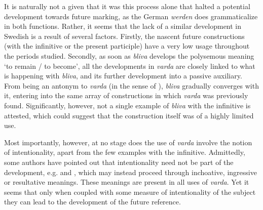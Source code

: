 \documentclass[output=paper,colorlinks,citecolor=brown]{langscibook}
\begin{document}
It is naturally not a given that it was this process alone that halted a potential development towards future marking, as the German \textit{werden} does grammaticalize in both functions. Rather, it seems that the lack of a similar development in Swedish is a result of several factors. Firstly, the nascent future constructions (with the infinitive or the present participle) have a very low usage throughout the periods studied. Secondly, as soon as \textit{bliva} develops the polysemous meaning ‘to remain / to become’, all the developments in \textit{varda} are closely linked to what is happening with \textit{bliva}, and its further development into a passive auxiliary. From being an antonym to \textit{varda} (in the sense of \citet[93]{Lobner1990}), \textit{bliva} gradually converges with it, entering into the same array of constructions in which \textit{varda} was previously found. Significantly, however, not a single example of \textit{bliva} with the infinitive is attested, which could suggest that the construction itself was of a highly limited use. 

Most importantly, however, at no stage does the use of \textit{varda} involve the notion of intentionality, apart from the few examples with the infinitive. Admittedly, some authors have pointed out that intentionality need not be part of the development, e.g. \citet[]{Traugott1978} and \citet[]{Dahl2000}, which may instead proceed through inchoative, ingressive or resultative meanings. These meanings are present in all uses of \textit{varda}. Yet it seems that only when coupled with some measure of intentionality of the subject they can lead to the development of the future reference.
\end{document}

